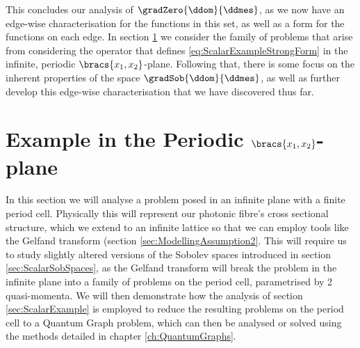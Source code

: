 This concludes our analysis of $\gradZero{\ddom}{\ddmes}$, as we now have an edge-wise characterisation for the functions in this set, as well as a form for the functions on each edge.
In section \ref{sec:ScalarSystem} we consider the family of problems that arise from considering the operator that defines \eqref{eq:ScalarExampleStrongForm} in the infinite, periodic $\bracs{x_1,x_2}$-plane.
Following that, there is some focus on the inherent properties of the space $\gradSob{\ddom}{\ddmes}$, as well as further develop this edge-wise characterisation that we have discovered thus far.

\section{Example in the Periodic $\bracs{x_1,x_2}$-plane} \label{sec:ScalarSystem}
In this section we will analyse a problem posed in an infinite plane with a finite period cell.
Physically this will represent our photonic fibre's cross sectional structure, which we extend to an infinite lattice so that we can employ tools like the Gelfand transform (section \ref{sec:ModellingAssumption2}.
This will require us to study slightly altered versions of the Sobolev spaces introduced in section \ref{sec:ScalarSobSpaces}, as the Gelfand transform will break the problem in the infinite plane into a family of problems on the period cell, parametrised by 2 quasi-momenta.
We will then demonstrate how the analysis of section \ref{sec:ScalarExample} is employed to reduce the resulting problems on the period cell to a Quantum Graph problem, which can then be analysed or solved using the methods detailed in chapter \ref{ch:QuantumGraphs}. \newline

